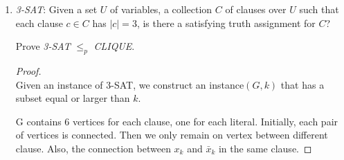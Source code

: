 \documentclass[12pt,a4paper]{article}
\theoremstyle{definition}
\begin{document}
\begin{enumerate}
    \begin{enumerate}
    \item
    Prove \emph{PARTITION} $\leq_p$ \emph{SUBSET SUM}.
	\begin{proof}
		~\\
		Instance of PARTITION: A finite set $A$ and a size $s(a)\in\mathbb{Z}$, there is a subset $A' \subseteq A$ that satisfies  $\sum_{a \in A'}s(a) = \sum_{a \in A-A'}s(a)$.
		
		Instance of SUBSETSUM: The same set $A$ with the instance of PARTITION and let B be the half of the sum of the elements in $A$.
		
		If $A'$ satisfies the requirement of the instance of PARTITION, we can easily know that it also satisfies the requirement of the instance of SUBSETSUM and vice versa.
	\end{proof}
    \item
    Prove \emph{SUBSET SUM} $\leq_p$ \emph{KNAPSACK}.
	\begin{proof}
		~\\
		Instance of PARTITION: A finite set $A$ and a size $s(a)\in\mathbb{Z}$ for each $a\in A$ and an integer B. A subset $A' \subseteq A$ such that $\sum_{a \in A'}s(a) = B$.
		
		Instance of KNAPSACK: The same set with set in the instance of PARTITION, and the same integer B. Let value of every element in A be 1 and $K=B$.
		
			If $A'$ satisfies the requirement of the instance of SUBSETSUM, we can easily know that it also satisfies the requirement of the instance of KNAPSACK and vice versa.
	\end{proof}
    \end{enumerate}

    \item
    \emph{3-SAT}: Given a set $U$ of variables, a collection $C$ of clauses over $U$ such that each clause $c \in  C$ has $|c| = 3$, is there a satisfying truth assignment for $C$?

    Prove \emph{3-SAT} $\leq_p$ \emph{CLIQUE}.
	\begin{proof}
		~\\
		Given an instance of 3-SAT, we construct an instance$(G,k)$ that has a subset equal or larger than $k$.
		
		G contains 6 vertices for each clause, one for each literal. Initially, each pair of vertices is connected. Then we only remain on vertex between different clause. Also, the connection between $x_k$ and $\bar x_k$
		in the same clause.
		

\end{proof}
\end{enumerate}
\end{document}
